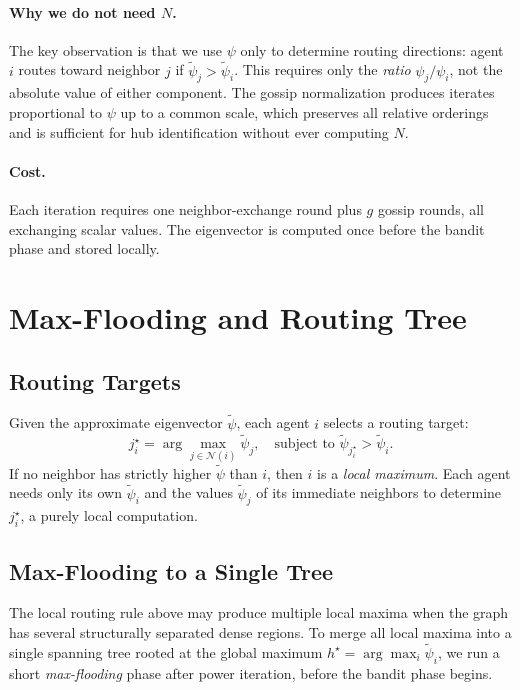 \documentclass{article}
\begin{document}
\paragraph{Why we do not need $N$.}
The key observation is that we use $\psi$ only to determine routing directions: agent $i$ routes toward neighbor $j$ if $\tilde{\psi}_j > \tilde{\psi}_i$. This requires only the \emph{ratio} $\psi_j / \psi_i$, not the absolute value of either component. The gossip normalization produces iterates proportional to $\psi$ up to a common scale, which preserves all relative orderings and is sufficient for hub identification without ever computing $N$.

\paragraph{Cost.} Each iteration requires one neighbor-exchange round plus $g$ gossip rounds, all exchanging scalar values. The eigenvector is computed once before the bandit phase and stored locally.

\section{Max-Flooding and Routing Tree}
\label{app:flooding}

\subsection{Routing Targets}

Given the approximate eigenvector $\tilde{\psi}$, each agent $i$ selects a routing target:
\[
j_i^\star = \arg\max_{j \in \mathcal{N}(i)} \tilde{\psi}_j, \quad \text{subject to } \tilde{\psi}_{j_i^\star} > \tilde{\psi}_i.
\]
If no neighbor has strictly higher $\tilde{\psi}$ than $i$, then $i$ is a \emph{local maximum}. Each agent needs only its own $\tilde{\psi}_i$ and the values $\tilde{\psi}_j$ of its immediate neighbors to determine $j_i^\star$, a purely local computation.

\subsection{Max-Flooding to a Single Tree}

The local routing rule above may produce multiple local maxima when the graph has several structurally separated dense regions. To merge all local maxima into a single spanning tree rooted at the global maximum $h^\star = \arg\max_i \tilde{\psi}_i$, we run a short \emph{max-flooding} phase after power iteration, before the bandit phase begins.
\end{document}
